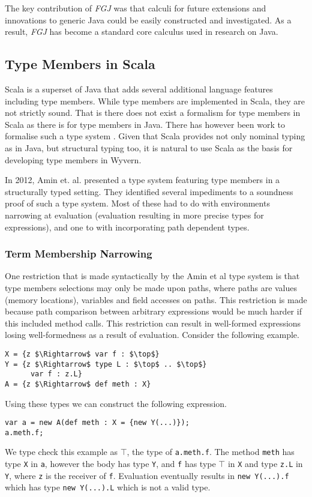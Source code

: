 \documentclass[11pt
              , a4paper
              , twoside
              , openright
              ]{report}
\numberwithin{case}{theorem}
\numberwithin{subcase}{case}
\begin{document}
The key contribution of \emph{FGJ} was that calculi for future extensions and innovations to generic Java could be easily constructed and investigated. As a result, \emph{FGJ} has become a standard core calculus used in research on Java.

\subsection{Type Members in Scala}
Scala \cite{scaladocs2016} is a superset of Java that adds several additional language features including type members. While type members are implemented in Scala, they are not strictly sound. That is there does not exist a formalism for type members in Scala as there is for type members in Java. There has however been work to formalise such a type system \cite{Amin:2014:FPT:2660193.2660216,amin:fool:2012}. Given that Scala provides not only nominal typing as in Java, but structural typing too, it is natural to use Scala as the basis for developing type members in Wyvern.

In 2012, Amin et. al. \cite{amin:fool:2012} presented a type system featuring type members in a structurally typed setting. They identified several impediments to a soundness proof of such a type system. Most of these had to do with environments narrowing at evaluation (evaluation resulting in more precise types for expressions), and one to with incorporating path dependent types. 

\subsubsection{Term Membership Narrowing}
One restriction that is made syntactically by the Amin et al \cite{amin:fool:2012} type system is that type members selections may only be made upon paths, where paths are values (memory locations), variables and field accesses on paths. This restriction is made because path comparison between arbitrary expressions would be much harder if this included method calls. This restriction can result in well-formed expressions losing well-formedness as a result of evaluation. Consider the following example.
\begin{lstlisting}[mathescape, style=custom_lang]
X = {z $\Rightarrow$ var f : $\top$}
Y = {z $\Rightarrow$ type L : $\top$ .. $\top$}
	  var f : z.L}
A = {z $\Rightarrow$ def meth : X}
\end{lstlisting}
Using these types we can construct the following expression.
\begin{lstlisting}[mathescape, style=custom_lang]
var a = new A(def meth : X = {new Y(...)});
a.meth.f;
\end{lstlisting}
We type check this example as $\top$, the type of \verb|a.meth.f|. The method \verb|meth| has type \verb|X| in \verb|a|, however the body has type \verb|Y|, and \verb|f| has type $\top$ in \verb|X| and type \verb|z.L| in \verb|Y|, where \verb|z| is the receiver of \verb|f|. Evaluation eventually results in \verb|new Y(...).f| which has type \verb|new Y(...).L| which is not a valid type. 
\end{document}
